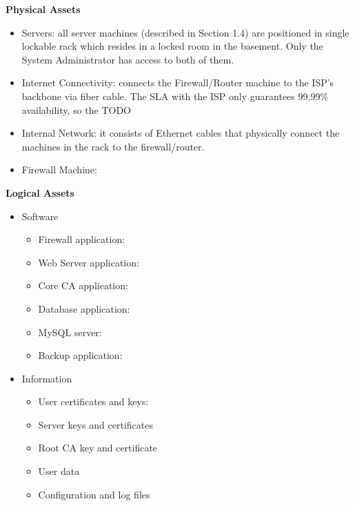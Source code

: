 \documentclass[english]{article}
\begin{document}

\textbf{Physical Assets}
\begin{itemize}
\item Servers: all server machines (described in Section 1.4) are positioned in single lockable rack which resides in a locked room in the basement. Only the System Administrator has access to both of them.
\item Internet Connectivity: connects the Firewall/Router machine to the ISP's backbone via fiber cable. The SLA with the ISP only guarantees 99.99\% availability, so the TODO
\item Internal Network: it consists of Ethernet cables that physically connect the machines in the rack to the firewall/router.
\item Firewall Machine:
\end{itemize}


\noindent\textbf{Logical Assets}
\begin{itemize}
    \item Software
    \begin{itemize}
        \item Firewall application:
    	\item Web Server application:
        \item Core CA application:
        \item Database application:
        \item MySQL server: 
        \item Backup application:
    \end{itemize}
    \item Information
    \begin{itemize}
        \item User certificates and keys:
        \item Server keys and certificates
        \item Root CA key and certificate
        \item User data
        \item Configuration and log files
    \end{itemize}
\end{itemize}
\end{document}

